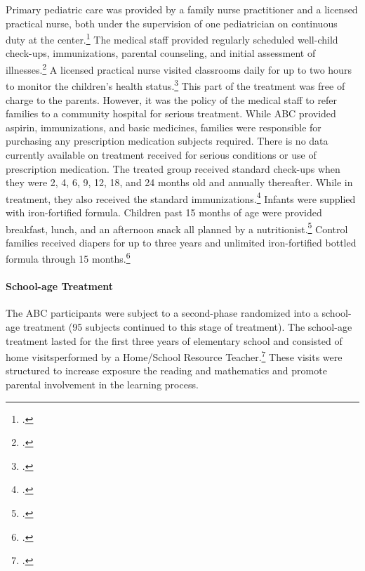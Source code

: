 \noindent Primary pediatric care was provided by a family nurse practitioner and a licensed practical nurse, both under the supervision of one pediatrician on continuous duty at the center.\footnote{\citet{Haskins-et-al_1978_JoPP}.} The medical staff provided regularly scheduled well-child check-ups, immunizations, parental counseling, and initial assessment of illnesses.\footnote{\citet{Ramey-et-al_1977_Intro-to-ABC}.} A licensed practical nurse visited classrooms daily for up to two hours to monitor the children's health status.\footnote{\citet{Sanyal_Henderson_etal_1980_JoPediatrics}.} This part of the treatment was free of charge to the parents. However, it was the policy of the medical staff to refer families to a community hospital for serious treatment. While ABC provided aspirin, immunizations, and basic medicines, families were responsible for purchasing any prescription medication subjects required. There is no data currently available on treatment received for serious conditions or use of prescription medication. The treated group received standard check-ups when they were 2, 4, 6, 9, 12, 18, and 24 months old and annually thereafter. While in treatment, they also received the standard immunizations.\footnote{\citet{Campbell_Conti_etal_2014_EarlyChildhoodInvestments}.} Infants were supplied with iron-fortified formula. Children past 15 months of age were provided breakfast, lunch, and an
afternoon snack all planned by a nutritionist.\footnote{\citet{Campbell_Conti_etal_2014_EarlyChildhoodInvestments,abc2014-2015interviews}.} Control families received diapers for up to three years and unlimited iron-fortified bottled formula through 15 months.\footnote{\citet{Ramey_Collier_etal_1976_CarolinaAbecedarianProject,Ramey_Campbell_1979_SR}.}

\paragraph{School-age Treatment}

\noindent The ABC participants were subject to a second-phase randomized into a school-age treatment (95 subjects continued to this stage of treatment). The school-age treatment lasted for the first three years of elementary school and consisted of home visitsperformed by a Home/School Resource Teacher.\footnote{\cite{Burchinal_Campbell_etal_1997_CD}.} These visits were structured to increase exposure the reading and mathematics and promote parental involvement in the learning process.\\

